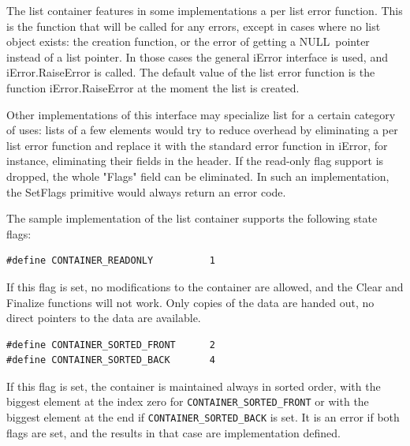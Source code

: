 \documentclass[12pt,a4paper,openany]{memoir} %
\newif\iftth
\newcommand{\Null}{{\iftth \ NULL \else \footnotesize NULL\  \fi}}
\newlength{\drop}
\begin{document}
The list container features in some implementations a per list error function.  This is the function that will be called for any errors, except in  
cases where no list object exists: the creation function, or the error of getting a \Null pointer instead of a list pointer. In those cases the general 
iError interface is used, and iError.RaiseError is called. The default value of the list error function is the function iError.RaiseError at the moment 
the list is created.

Other implementations of this interface may specialize list for a certain category of uses: lists of a few elements would try to reduce overhead by 
eliminating a per list error function and replace it with the standard error function in iError, for instance, eliminating their fields in the header. 
If the read-only flag support is dropped, the whole "Flags" field can be eliminated. In such an implementation, the SetFlags primitive would always 
return an error code.

The sample implementation of the list container supports the following state flags:
\begin{verbatim}
#define CONTAINER_READONLY          1
\end{verbatim}
If this flag is set, no modifications to the container are allowed, and the Clear and Finalize functions will not work. Only copies of the data are 
handed out, no direct pointers to the data are available.
\begin{verbatim}
#define CONTAINER_SORTED_FRONT      2
#define CONTAINER_SORTED_BACK       4
\end{verbatim}
If this flag is set, the container is maintained always in sorted order, with the biggest element at the index zero for \verb,CONTAINER_SORTED_FRONT,
or with the biggest element at the end if \verb,CONTAINER_SORTED_BACK, is set. It is an error if both flags are set, and the results in that  case
are implementation defined.
\end{document}
